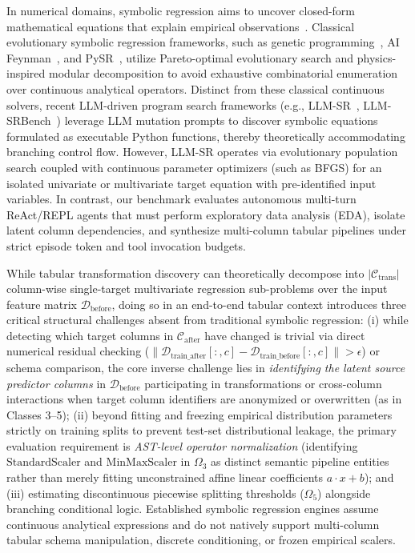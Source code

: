 \documentclass[sigconf]{acmart}
\begin{document}
In numerical domains, symbolic regression aims to uncover closed-form mathematical equations that explain empirical observations~\cite{schmidt2009distilling,udrescu2020ai,cranmer2020frontier}. Classical evolutionary symbolic regression frameworks, such as genetic programming~\cite{schmidt2009distilling}, AI Feynman~\cite{udrescu2020ai}, and PySR~\cite{cranmer2023pysr}, utilize Pareto-optimal evolutionary search and physics-inspired modular decomposition to avoid exhaustive combinatorial enumeration over continuous analytical operators. Distinct from these classical continuous solvers, recent LLM-driven program search frameworks (e.g., LLM-SR~\cite{shojaee2025llmsr}, LLM-SRBench~\cite{shojaee2025llmsrbench}) leverage LLM mutation prompts to discover symbolic equations formulated as executable Python functions, thereby theoretically accommodating branching control flow. However, LLM-SR operates via evolutionary population search coupled with continuous parameter optimizers (such as BFGS) for an isolated univariate or multivariate target equation with pre-identified input variables. In contrast, our benchmark evaluates autonomous multi-turn ReAct/REPL agents that must perform exploratory data analysis (EDA), isolate latent column dependencies, and synthesize multi-column tabular pipelines under strict episode token and tool invocation budgets.

While tabular transformation discovery can theoretically decompose into $|\mathcal{C}_{\text{trans}}|$ column-wise single-target multivariate regression sub-problems over the input feature matrix $\mathcal{D}_{\text{before}}$, doing so in an end-to-end tabular context introduces three critical structural challenges absent from traditional symbolic regression: (i) while detecting which target columns in $\mathcal{C}_{\text{after}}$ have changed is trivial via direct numerical residual checking ($\|\mathcal{D}_{\text{train\_after}}[:, c] - \mathcal{D}_{\text{train\_before}}[:, c]\| > \epsilon$) or schema comparison, the core inverse challenge lies in \emph{identifying the latent source predictor columns} in $\mathcal{D}_{\text{before}}$ participating in transformations or cross-column interactions when target column identifiers are anonymized or overwritten (as in Classes 3--5); (ii) beyond fitting and freezing empirical distribution parameters strictly on training splits to prevent test-set distributional leakage, the primary evaluation requirement is \emph{AST-level operator normalization} (identifying $\text{StandardScaler}$ and $\text{MinMaxScaler}$ in $\Omega_3$ as distinct semantic pipeline entities rather than merely fitting unconstrained affine linear coefficients $a \cdot x + b$); and (iii) estimating discontinuous piecewise splitting thresholds ($\Omega_5$) alongside branching conditional logic. Established symbolic regression engines assume continuous analytical expressions and do not natively support multi-column tabular schema manipulation, discrete conditioning, or frozen empirical scalers.
\end{document}
